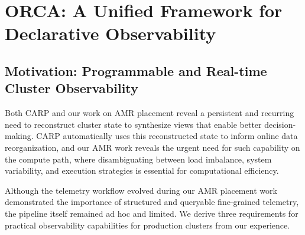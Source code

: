 \chapter{ORCA: A Unified Framework for Declarative Observability}
\label{chap:orca}

\section{Motivation: Programmable and Real-time Cluster Observability}


Both CARP and our work on AMR placement reveal a persistent and recurring need to reconstruct
cluster state to synthesize views that enable better decision-making.
CARP automatically uses this reconstructed state to inform online data reorganization, and our AMR
work reveals the urgent need for such capability on the compute path, where disambiguating between
load imbalance, system variability, and execution strategies is essential for computational
efficiency.

Although the telemetry workflow evolved during our AMR placement work demonstrated the importance
of structured and queryable fine-grained telemetry, the pipeline itself remained ad hoc and limited.
We derive three requirements for practical observability capabilities for production clusters from
our experience.

